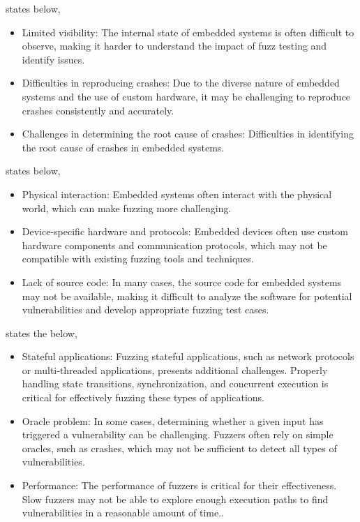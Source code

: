  states below,
\begin{itemize}
\item Limited visibility: The internal state of embedded systems is
often difficult to observe, making it harder to understand the impact of
fuzz testing and identify issues\cite{muench2018you}.
\item Difficulties in reproducing crashes: Due to the diverse nature of
embedded systems and the use of custom hardware, it may be challenging to
reproduce crashes consistently and accurately\cite{muench2018you}.
\item Challenges in determining the root cause of crashes: Difficulties in
identifying the root cause of crashes in embedded systems\cite{muench2018you}.
\end{itemize}

 states below,
\begin{itemize}
\item Physical interaction: Embedded systems often interact with the
physical world, which can make fuzzing more challenging\cite{eisele2022embedded}.
\item Device-specific hardware and protocols: Embedded devices often use
custom hardware components and communication protocols, which may not be
compatible with existing fuzzing tools and techniques\cite{eisele2022embedded}.
\item Lack of source code: In many cases, the source code for embedded
systems may not be available, making it difficult to analyze the software
for potential vulnerabilities and develop appropriate fuzzing test cases\cite{eisele2022embedded}.
\end{itemize}

 states the below,
\begin{itemize}
\item Stateful applications: Fuzzing stateful applications, such as network
protocols or multi-threaded applications, presents additional challenges.
Properly handling state transitions, synchronization, and concurrent execution
is critical for effectively fuzzing these types of applications\cite{manes2019art}.
\item Oracle problem:  In some cases, determining whether a given input has
triggered a vulnerability can be challenging. Fuzzers often rely on simple
oracles, such as crashes, which may not be sufficient to detect all
types of vulnerabilities\cite{manes2019art}.
\item Performance: The performance of fuzzers is critical for their effectiveness.
Slow fuzzers may not be able to explore enough execution paths to find
vulnerabilities in a reasonable amount of time.\cite{manes2019art}.
\end{itemize}

